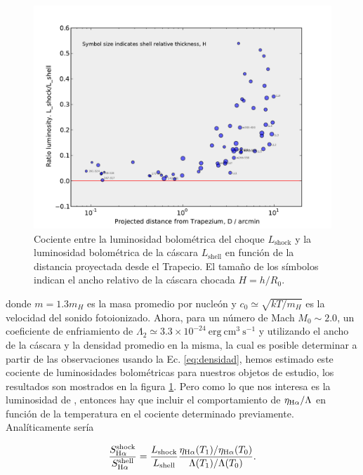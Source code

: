 \begin{figure}
  \centering
  \includegraphics[width=.95\linewidth, clip]{luis-programas/luminosity-ratio}
  \caption{Cociente entre la luminosidad bolométrica del choque \(L_{\text{shock}}\) y la luminosidad bolométrica de la cáscara \(L_{\text{shell}}\) en función de la distancia proyectada desde el Trapecio. El tamaño de los símbolos indican el ancho relativo de la cáscara chocada \(H=h/R_{0}\).}
  \label{fig:ratio-lumi}
\end{figure}

donde \(m=1.3m_{H}\) es la masa promedio por nucleón y \(c_{0} \simeq \sqrt{kT/m_{H}}\) es la velocidad del sonido fotoionizado. Ahora, para un número de Mach \(M_{0} \sim 2.0\), un coeficiente de enfriamiento de  \(\Lambda_{2} \simeq 3.3\times10^{-24}~\mathrm{erg~cm^{3}~s^{-1}}\) \citep{Osterbrock:2006} y utilizando el ancho de la cáscara y la densidad promedio en la misma, la cual es posible determinar a partir de las observaciones usando la Ec. \ref{eq:densidad}, hemos estimado este cociente  de luminosidades bolométricas para nuestros objetos de estudio, los resultados son mostrados en la figura \ref{fig:ratio-lumi}. Pero como lo que nos interesa es la luminosidad de \ha{}, entonces hay que incluir el comportamiento de \(\eta_{\mathrm{H}\alpha{}}/\Lambda\) en función de la temperatura en el cociente determinado previamente. Analíticamente sería

\begin{equation}
  \label{eq:ratio-bri}
  \frac{S^{\text{shock}}_{\mathrm{H}\alpha}}{S^{\text{shell}}_{\mathrm{H}\alpha}} = \frac{L_{\text{shock}}}{L_{\text{shell}}} \frac{\eta_{\mathrm{H}\alpha}(T_{1})/\eta_{\mathrm{H}\alpha}(T_{0})}{\Lambda(T_{1})/\Lambda(T_{0})}.
\end{equation}

